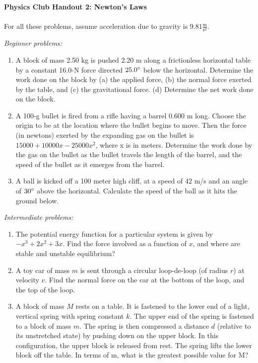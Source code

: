 \documentclass[12pt]{article}
\begin{document}
\textbf{Physics Club Handout 2: Newton's Laws}
\\
\\
For all these problems, assume acceleration due to gravity is $9.81\frac{\text{m}}{\text{s}^2}$.

\emph{Beginner problems:}
\begin{enumerate}
\item
A block of mass 2.50 kg is pushed 2.20 m along a frictionless horizontal table by a constant 16.0-N force directed $25.0\degree$ below the horizontal. Determine the work done on
the block by (a) the applied force, (b) the normal force
exerted by the table, and (c) the gravitational force.
(d) Determine the net work done on the block.

\item
A 100-g bullet is fired from a rifle having a barrel 0.600 m long. Choose the origin to be at the location where the bullet begins to move. Then the force (in newtons) exerted by the expanding gas on the bullet is $15000+10000x-25000x^2$, where  x is in meters. Determine the work done by the gas on the bullet as the bullet travels the length of the barrel, and the speed of the bullet as it emerges from the barrel.

\item
A ball is kicked off a 100 meter high cliff, at a speed of 42 m/s and an angle of $30\degree$ above the horizontal. Calculate the speed of the ball as it hits the ground below.

\end{enumerate}

\emph{Intermediate problems:}
\begin{enumerate}
\item
The potential energy function for a particular system is given by $-x^3+2x^2+3x$. Find the force involved as a function of $x$, and where are stable and unstable equilibrium?

\item
A toy car of mass $m$ is sent through a circular loop-de-loop (of radius $r$) at velocity $v$. Find the normal force on the car at the bottom of the loop, and the top of the loop.

\item
A block of mass $M$ rests on a table. It is fastened to the lower end of a light, vertical spring with spring constant $k$. The upper end of the spring is fastened to a block of mass $m$. The spring is then compressed a distance $d$ (relative to its unstretched state) by pushing down on the upper block. In this configuration, the upper block is released from rest. The spring lifts the lower block off the table. In terms of m, what is the greatest possible value for M?

\end{enumerate}
\end{document}
